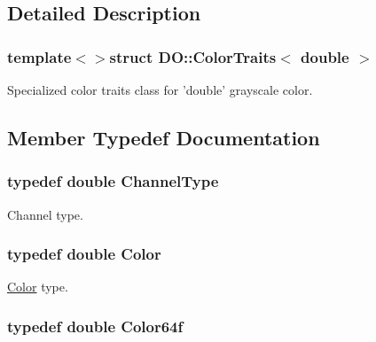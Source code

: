 \subsection{Detailed Description}
\subsubsection*{template$<$$>$struct D\-O\-::\-Color\-Traits$<$ double $>$}

Specialized color traits class for 'double' grayscale color. 

\subsection{Member Typedef Documentation}
\hypertarget{struct_d_o_1_1_color_traits_3_01double_01_4_ae21d84313286d731e69913a7fd7a538e}{
\subsubsection[{Channel\-Type}]{\setlength{\rightskip}{0pt plus 5cm}typedef double {\bf Channel\-Type}}}\label{struct_d_o_1_1_color_traits_3_01double_01_4_ae21d84313286d731e69913a7fd7a538e}
Channel type. \hypertarget{struct_d_o_1_1_color_traits_3_01double_01_4_a8b96d8e5cd628393636da37219eb5a2d}{
\subsubsection[{Color}]{\setlength{\rightskip}{0pt plus 5cm}typedef double {\bf Color}}}\label{struct_d_o_1_1_color_traits_3_01double_01_4_a8b96d8e5cd628393636da37219eb5a2d}
\hyperlink{class_d_o_1_1_color}{Color} type. \hypertarget{struct_d_o_1_1_color_traits_3_01double_01_4_a9a301fd8ba0a7225e38351d3e5b2e4d3}{
\subsubsection[{Color64f}]{\setlength{\rightskip}{0pt plus 5cm}typedef double {\bf Color64f}}}\label{struct_d_o_1_1_color_traits_3_01double_01_4_a9a301fd8ba0a7225e38351d3e5b2e4d3}
